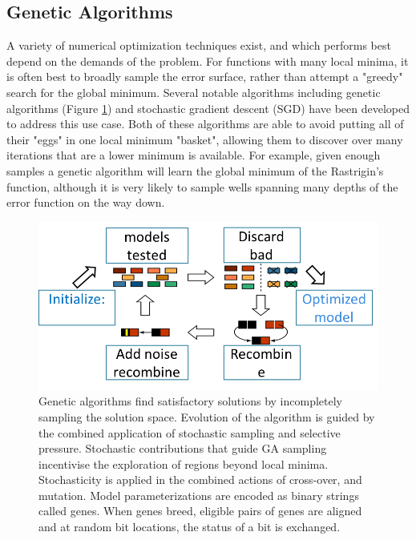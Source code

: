 \subsection{Genetic Algorithms}
A variety of numerical optimization techniques exist, and which performs best depend on the demands of the problem.
For functions with many local minima, it is often best to broadly sample the error surface, rather than attempt a "greedy" search for the global minimum.
Several notable algorithms including genetic algorithms (Figure \ref{fig:GeneticAlgOver}) and stochastic gradient descent (SGD) have been developed to address this use case.
Both of these algorithms are able to avoid putting all of their "eggs" in one local minimum "basket", allowing them to discover over many iterations that are a lower minimum is available.
For example, given enough samples a genetic algorithm will learn the global minimum of the Rastrigin's function, although it is very likely to sample wells spanning many depths of the error function on the way down.

\begin{figure}
\begin{center}

    \includegraphics[width=0.7\linewidth]{figures/How_Genetic_Alg_Works.png}
  \caption{Genetic algorithms find satisfactory solutions by incompletely sampling the solution space. Evolution of the algorithm is guided by the combined application of stochastic sampling and selective pressure. Stochastic contributions that guide GA sampling incentivise the exploration of regions beyond local minima. Stochasticity is applied in the combined actions of cross-over, and mutation. Model parameterizations are encoded as binary strings called genes. When genes breed, eligible pairs of genes are aligned and at random bit locations, the status of a bit is exchanged.  
}
  \label{fig:GeneticAlgOver}
\end{center}

\end{figure}
  

